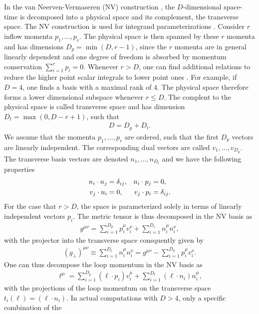 In the van Neerven-Vermaseren (NV) construction
\cite{Neerven1984a}, the $D$-dimensional
space-time is decomposed into a physical space and its complement, the
transverse space. The NV construction is used for integrand
parameterizations \cite{Ellis:2007br,Ita:2011hi}. Consider $r$ inflow momenta $p_1,\dots,p_r$. The
physical space is then spanned by these $r$ momenta and has dimensions
$D_p=\min(D,r-1)$, since the $r$ momenta are in general linearly dependent and one degree of freedom is absorbed by momentum
conservation $\sum_{i=1}^rp_i = 0$. Whenever $r>D$, one can find
additional relations to reduce the higher point scalar integrals to
lower point ones \cite{Melrose1965}. For example, if $D=4$, one finds
a basis with a maximal rank of $4$. The physical space therefore forms
a lower dimensional subspace whenever $r\leq D$. The complent to the
physical space is called
transverse space and has dimension $D_t=\max(0,D-r+1)$, such that
\begin{align}
  D=D_p+D_t.
\end{align}
We assume that the momenta $p_1,\dots,p_r$ are ordered, such that the
first $D_p$ vectors are linearly independent. The corresponding dual
vectors are called $v_{1},\dots,v_{D_p}$. The transverse basis
vectors are denoted $n_{1},\dots,n_{D_t}$ and we have the following properties
\begin{align}
    n_i\cdot n_j &= \delta_{ij}, & n_i\cdot p_j &= 0,\\
   v_j \cdot n_i  &= 0, & v_j\cdot p_i &= \delta_{ij}.\notag
\end{align}
For the case that $r > D$, the space
is parameterized solely in terms of linearly independent vectors
$p_i$. 
 The metric tensor is thus decomposed in the NV basis as 
\begin{align}
  g^{\mu\nu} = \sum_{i=1}^{D_p}p_i^\mu v_i^\nu+\sum_{i=1}^{D_t}n_i^\mu n_i^\nu,
\end{align}
with the projector into the transverse space consquently given by
\begin{align}\label{eq:metricpron}
  (g_\perp)^{\mu\nu} \equiv  \sum_{i=1}^{D_t}n_i^\mu n_i^\nu = g^{\mu\nu}- \sum_{i=1}^{D_p}p_i^\mu v_i^\nu.
\end{align}
One can thus decompose the loop momentum in the NV basis as 
\begin{align}
  \ell^\mu = \sum_{i=1}^{D_p}(\ell\cdot p_i)
  v_i^\mu+\sum_{i=1}^{D_t}(\ell\cdot n_i) n_i^\mu,
\end{align}
with the projections of the loop momentum on the transverse space
$t_i(\ell) = (\ell \cdot n_i)$.  In actual computations with $D>4$, only a specific combination of the
